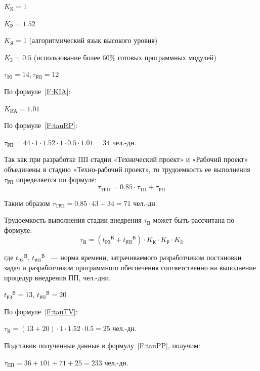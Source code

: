$K_{\text{К}} = 1$

$K_{\text{Р}} = 1.52$

$K_{\text{Я}} = 1$ (алгоритмический язык высокого уровня)

$K_{\text{З}} = 0.5$ (использование более 60\% готовых программных модулей)

$\tau_{\text{РЗ}} = 14, \tau_{\text{РП}} = 12$

По формуле~\ref{F:KIA}:

$K_{\text{ИА}} = 1.01$

По формуле~\ref{F:tauRP}:

$\tau_{\text{РП}} = 44 \cdot 1 \cdot 1.52 \cdot 1 \cdot 0.5 \cdot 1.01 = 34$ чел.-дн.

Так как при разработке ПП стадии «Технический проект» и «Рабочий проект» объединены в стадию «Техно-рабочий проект», то трудоемкость ее выполнения $\tau_{\text{РП}}$ определяется по формуле:
\begin{equation}
\tau_{\text{ТРП}} = 0.85 \cdot \tau_{\text{ТП}} + \tau_{\text{РП}}
\label{F:tauTRP}
\end{equation}

Таким образом $\tau_{\text{ТРП}} = 0.85 \cdot 43 + 34 = 71$ чел.-дн.

Трудоемкость выполнения стадии внедрения $\tau_{\text{В}}$ может быть рассчитана по формуле:
\begin{equation}
\tau_{\text{В}} = ({t_{\text{РЗ}}}^\text{В} + {t_{\text{РП}}}^\text{В}) \cdot K_{\text{К}} \cdot K_{\text{Р}} \cdot K_{\text{З}}
\label{F:tauTV}
\end{equation}

где ${t_{\text{РЗ}}}^\text{В}$, ${t_{\text{РП}}}^\text{В}$ ~--- норма времени, затрачиваемого разработчиком постановки задач и разработчиком программного обеспечения соответственно на выполнение процедур внедрения ПП, чел.-дни.

${t_{\text{РЗ}}}^\text{В} = 13$, ${t_{\text{РП}}}^\text{В} = 20$

По формуле~\ref{F:tauTV}:

$\tau_{\text{В}} = (13+20) \cdot 1 \cdot 1.52 \cdot 0.5 = 25$ чел.-дн.

Подставив полученные данные в формулу~\ref{F:tauPP}, получим:

$\tau_{\text{ПП}} = 36 + 101 + 71 + 25 = 233$ чел.-дн.

